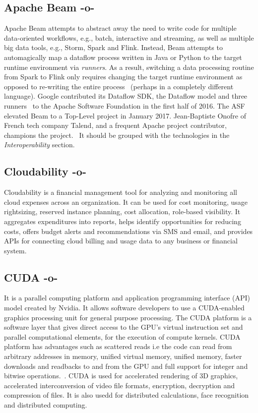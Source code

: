 \subsection{Apache Beam -o-}

Apache Beam attempts to abstract away the need to write code for
multiple data-oriented workflows, e.g., batch, interactive and
streaming, as well as multiple big data tools, e.g., Storm, Spark and
Flink.  Instead, Beam attempts to automagically map a dataflow process
written in Java or Python to the target runtime environment via
\textit{runners}.  As a result, switching a data processing routine from
Spark to Flink only requires changing the target runtime environment
as opposed to re-writing the entire
process~\cite{www-infoworld-apachebeam} (perhaps in a completely
different language).  Google contributed its Dataflow SDK, the
Dataflow model and three runners~\cite{www-datanami-apachebeam} to the
Apache Software Foundation in the first half of 2016.  The ASF
elevated Beam to a Top-Level project in January 2017.  Jean-Baptiste
Onofre of French tech company Talend, and a frequent Apache project
contributor, champions the project.~\cite{www-talend-apachebeam} It
should be grouped with the technologies in the \textit{Interoperability}
section.

\subsection{Cloudability -o-}

Cloudability is a financial management tool for analyzing and
monitoring all cloud expenses across an organization. It can be used
for cost monitoring, usage rightsizing, reserved instance planning,
cost allocation, role-based visibility. It aggregates expenditures
into reports, helps identify opportunities for reducing costs, offers
budget alerts and recommendations via SMS and email, and provides APIs
for connecting cloud billing and usage data to any business or
financial system.~\cite{www-cloudability}



\subsection{CUDA -o-}

It is a parallel computing platform and application programming
interface (API) model created by Nvidia. It allows software developers
to use a CUDA-enabled graphics processing unit for general purpose
processing. The CUDA platform is a software layer that gives direct
access to the GPU's virtual instruction set and parallel computational
elements, for the execution of compute kernels.  CUDA platform has
advantages such as scattered reads i.e the code can read from
arbitrary addresses in memory, unified virtual memory, unified memory,
faster downloads and readbacks to and from the GPU and full support
for integer and bitwise operations.~\cite{www-cuda-wikipedia}.  CUDA
is used for accelerated rendering of 3D graphics, accelerated
interconversion of video file formats, encryption, decryption and
compression of files.  It is also usedd for distributed calculations,
face recognition and distributed computing.~\cite{www-cuda-wikipedia}
	  

